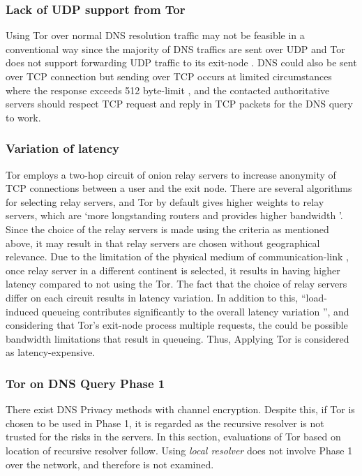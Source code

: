 \subsubsection{Lack of UDP support from Tor}
Using Tor over normal DNS resolution traffic may not be feasible in a conventional way since the majority of DNS traffics are sent over UDP and Tor does not support forwarding UDP traffic to its exit-node \cite{udp-over-tor, dingledine2004tor}.
DNS could also be sent over TCP connection but sending over TCP occurs at limited circumstances where the response exceeds 512 byte-limit \cite{rfc7766}, and the contacted authoritative servers should respect TCP request and reply in TCP packets for the DNS query to work.

\subsubsection{Variation of latency}
Tor employs a two-hop circuit of onion relay servers to increase anonymity of TCP connections between a user and the exit node.
There are several algorithms for selecting relay servers, and Tor by default gives higher weights to relay servers, which are `more longstanding routers and provides higher bandwidth \cite{wacek2013empirical}'.
Since the choice of the relay servers is made using the criteria as mentioned above, it may result in that relay servers are chosen without geographical relevance.
Due to the limitation of the physical medium of communication-link \cite{Singla:2014:ISL}, once relay server in a different continent is selected, it results in having higher latency compared to not using the Tor.
The fact that the choice of relay servers differ on each circuit results in latency variation. In addition to this, ``load-induced queueing contributes significantly to the overall latency variation \cite{Hoiland-Jorgensen:2016}'', and considering that Tor's exit-node process multiple requests, the could be possible bandwidth limitations that result in queueing.
Thus, Applying Tor is considered as latency-expensive.

\subsubsection{Tor on DNS Query Phase 1}
There exist DNS Privacy methods with channel encryption. Despite this, if Tor is chosen to be used in Phase 1, it is regarded as the recursive resolver is not trusted for the risks in the servers.
In this section, evaluations of Tor based on location of recursive resolver follow. Using \textit{local resolver} does not involve Phase 1 over the network, and therefore is not examined.

